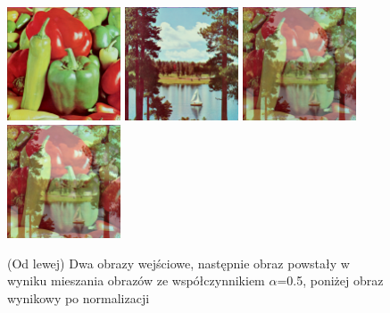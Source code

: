 \documentclass[final,a4paper,openany,12pt]{mwbk}
\begin{document}
\hfill
\\\\
\indent

\begin{figure}[H]
	\begin{center}
		\includegraphics[width=0.3\textwidth]{1/1Color_Mix_Img1_Original}
		\includegraphics[width=0.3\textwidth]{1/1Color_Mix_Img2_Original}
		\includegraphics[width=0.3\textwidth]{1/1Color_Mix_Img_Result}
		\includegraphics[width=0.3\textwidth]{1/1Color_Mix_Img_Result_Norm}
	\end{center}
	\caption{(Od lewej) Dwa obrazy wejściowe, następnie obraz powstały w wyniku mieszania obrazów ze współczynnikiem $\alpha$=0.5, poniżej obraz wynikowy po normalizacji }
\end{figure}
\end{document}
